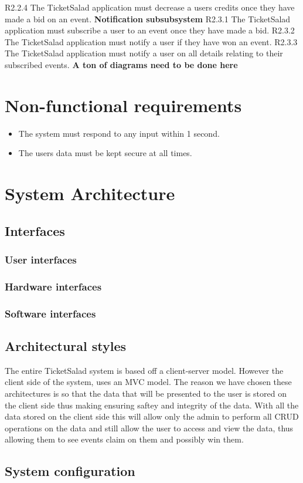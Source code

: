\documentclass[11pt]{article}
\begin{document}
	R2.2.4 The TicketSalad application must decrease a users credits once they have made a bid on an event.
	\newline
	\newline
	\textbf{Notification subsubsystem}
	\newline
	R2.3.1 The TicketSalad application must subscribe a user to an event once they have made a bid.
	\newline
	R2.3.2 The TicketSalad application must notify a user if they have won an event.
	\newline
	R2.3.3 The TicketSalad application must notify a user on all details relating to their subscribed events.
	\newline
	\textbf{A ton of diagrams need to be done here}	
	\section{Non-functional requirements}
	\begin{itemize}
		\item The system must respond to any input within 1 second.
		\item The users data must be kept secure at all times.
	\end{itemize}

	\section{System Architecture}
	\subsection{Interfaces}
	\subsubsection{User interfaces}
	\subsubsection{Hardware interfaces}
	\subsubsection{Software interfaces}
	\subsection{Architectural styles}
	The entire TicketSalad system is based off a client-server model. However the client side of the system, uses an MVC model. The reason we have chosen these architectures is so that the data that will be presented to the user is stored on the client side thus making ensuring saftey and integrity of the data. With all the data stored on the client side this will allow only the admin to perform all CRUD operations on the data and still allow the user to access and view the data, thus allowing them to see events claim on them and possibly win them.
	
	\subsection{System configuration}
	\
	
	
\end{document}
